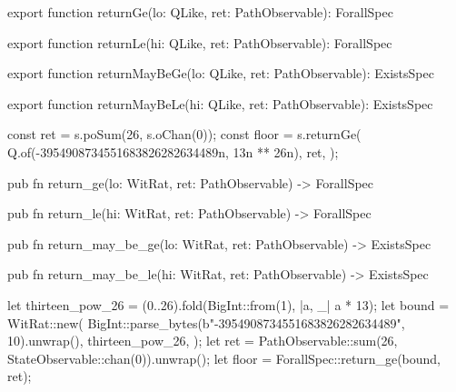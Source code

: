 \begin{tssrc}
export function returnGe(lo: QLike, ret: PathObservable): ForallSpec

export function returnLe(hi: QLike, ret: PathObservable): ForallSpec

export function returnMayBeGe(lo: QLike, ret: PathObservable): ExistsSpec

export function returnMayBeLe(hi: QLike, ret: PathObservable): ExistsSpec
\end{tssrc}
\begin{tssrc}
const ret = s.poSum(26, s.oChan(0));
const floor = s.returnGe(
  Q.of(-3954908734551683826282634489n, 13n ** 26n),
  ret,
);
\end{tssrc}
\begin{rustsrc}
pub fn return_ge(lo: WitRat, ret: PathObservable) -> ForallSpec

pub fn return_le(hi: WitRat, ret: PathObservable) -> ForallSpec

pub fn return_may_be_ge(lo: WitRat, ret: PathObservable) -> ExistsSpec

pub fn return_may_be_le(hi: WitRat, ret: PathObservable) -> ExistsSpec
\end{rustsrc}
\begin{rustsrc}
let thirteen_pow_26 = (0..26).fold(BigInt::from(1), |a, _| a * 13);
let bound = WitRat::new(
    BigInt::parse_bytes(b"-3954908734551683826282634489", 10).unwrap(),
    thirteen_pow_26,
);
let ret = PathObservable::sum(26, StateObservable::chan(0)).unwrap();
let floor = ForallSpec::return_ge(bound, ret);
\end{rustsrc}
